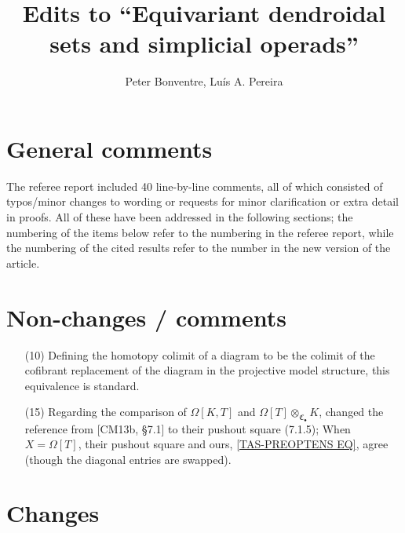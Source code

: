 \documentclass[a4paper,10pt
]{article}%
\title{Edits to ``Equivariant dendroidal sets and simplicial operads''}
\author{Peter Bonventre, Lu\'is A. Pereira}%
\numberwithin{equation}{section}
\numberwithin{figure}{section}
\theoremstyle{definition} %
\DeclareMathOperator{\colim}{colim}%
\newcommand{\1}{\ensuremath{\mathbbm 1}}%
\begin{document}
 
  
\maketitle
 



\section{General comments}

The referee report included 40 line-by-line comments, 
all of which consisted of typos/minor changes to wording
or requests for minor clarification or extra detail in proofs.
All of these have been addressed in the following sections;
the numbering of the items below refer to the numbering in the referee report,
while the numbering of the cited results refer to the number in the new version of the article.

      

\section{Non-changes / comments}

\begin{enumerate}
\item[(10)] Defining the homotopy colimit of a diagram to be the colimit of the cofibrant replacement of the diagram
        in the projective model structure, this equivalence is standard.
\item[(15)] Regarding the comparison of $\Omega[K,T]$ and $\Omega[T] \otimes_{\mathfrak C_\bullet} K$,
        changed the reference from [CM13b, \S 7.1] to their pushout square (7.1.5);
        When $X = \Omega[T]$, their pushout square and ours, \eqref{TAS-PREOPTENS EQ}, agree (though the diagonal entries are swapped).
\end{enumerate}

\section{Changes}
\end{document}
